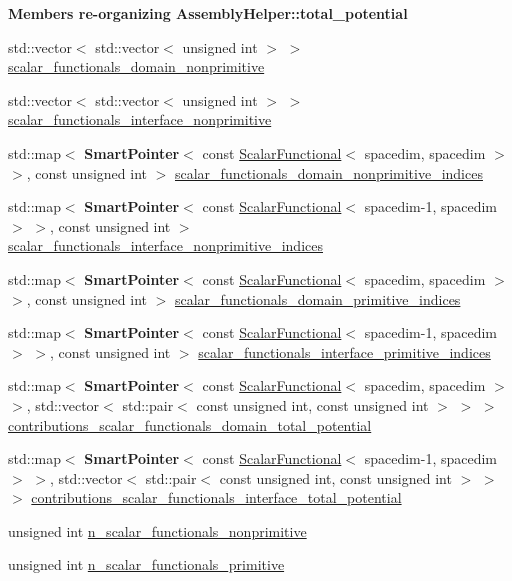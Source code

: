 \begin{Indent}{\bf Members re-\/organizing Assembly\+Helper\+:\+:total\+\_\+potential}
\begin{DoxyCompactItemize}
\item 
std\+::vector$<$ std\+::vector$<$ unsigned int $>$ $>$ \hyperlink{class_assembly_helper_a5fe78a019aec03cbeeb336d1d2874729}{scalar\+\_\+functionals\+\_\+domain\+\_\+nonprimitive}
\item 
std\+::vector$<$ std\+::vector$<$ unsigned int $>$ $>$ \hyperlink{class_assembly_helper_a833383aa6d157157545204143897ed9e}{scalar\+\_\+functionals\+\_\+interface\+\_\+nonprimitive}
\item 
std\+::map$<$ {\bf Smart\+Pointer}$<$ const \hyperlink{class_scalar_functional}{Scalar\+Functional}$<$ spacedim, spacedim $>$ $>$, const unsigned int $>$ \hyperlink{class_assembly_helper_acf05fab2ddf57769a103d82a4f2d1cd3}{scalar\+\_\+functionals\+\_\+domain\+\_\+nonprimitive\+\_\+indices}
\item 
std\+::map$<$ {\bf Smart\+Pointer}$<$ const \hyperlink{class_scalar_functional}{Scalar\+Functional}$<$ spacedim-\/1, spacedim $>$ $>$, const unsigned int $>$ \hyperlink{class_assembly_helper_a0d15b3ab0c7bec9fc4f40e532f8776f4}{scalar\+\_\+functionals\+\_\+interface\+\_\+nonprimitive\+\_\+indices}
\item 
std\+::map$<$ {\bf Smart\+Pointer}$<$ const \hyperlink{class_scalar_functional}{Scalar\+Functional}$<$ spacedim, spacedim $>$ $>$, const unsigned int $>$ \hyperlink{class_assembly_helper_a4f08790a2235e48ce19f5d8d965a7874}{scalar\+\_\+functionals\+\_\+domain\+\_\+primitive\+\_\+indices}
\item 
std\+::map$<$ {\bf Smart\+Pointer}$<$ const \hyperlink{class_scalar_functional}{Scalar\+Functional}$<$ spacedim-\/1, spacedim $>$ $>$, const unsigned int $>$ \hyperlink{class_assembly_helper_ad99c75f32cf3f18aa1d4067ad8b56ae8}{scalar\+\_\+functionals\+\_\+interface\+\_\+primitive\+\_\+indices}
\item 
std\+::map$<$ {\bf Smart\+Pointer}$<$ const \hyperlink{class_scalar_functional}{Scalar\+Functional}$<$ spacedim, spacedim $>$ $>$, std\+::vector$<$ std\+::pair$<$ const unsigned int, const unsigned int $>$ $>$ $>$ \hyperlink{class_assembly_helper_aceaf7ba62dfe0fa06ecb15ee8c14da34}{contributions\+\_\+scalar\+\_\+functionals\+\_\+domain\+\_\+total\+\_\+potential}
\item 
std\+::map$<$ {\bf Smart\+Pointer}$<$ const \hyperlink{class_scalar_functional}{Scalar\+Functional}$<$ spacedim-\/1, spacedim $>$ $>$, std\+::vector$<$ std\+::pair$<$ const unsigned int, const unsigned int $>$ $>$ $>$ \hyperlink{class_assembly_helper_a9e76874224ab4946218fdce9bdba0e03}{contributions\+\_\+scalar\+\_\+functionals\+\_\+interface\+\_\+total\+\_\+potential}
\item 
unsigned int \hyperlink{class_assembly_helper_af7bcfc1db651535a7aefc6071a81e124}{n\+\_\+scalar\+\_\+functionals\+\_\+nonprimitive}
\item 
unsigned int \hyperlink{class_assembly_helper_af5e03e8e47a85dbc96444ef61525c454}{n\+\_\+scalar\+\_\+functionals\+\_\+primitive}
\end{DoxyCompactItemize}
\end{Indent}
